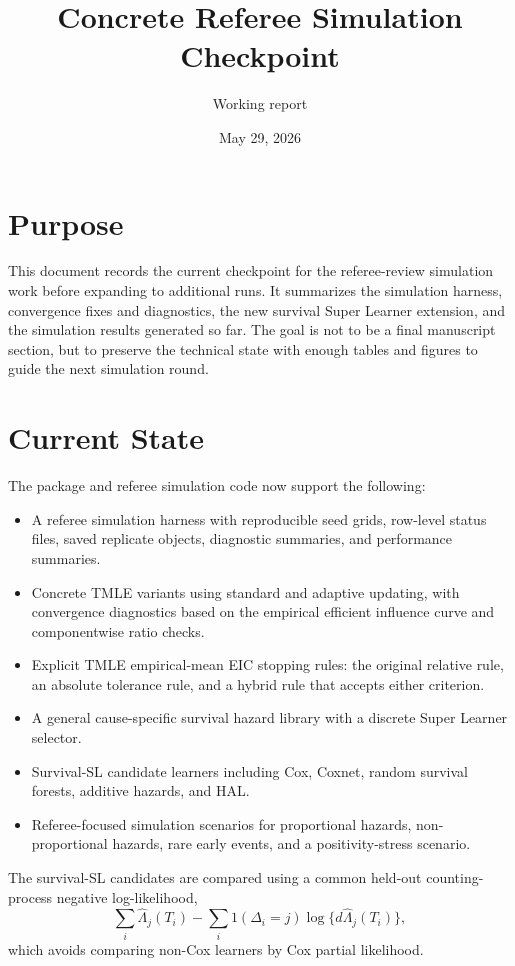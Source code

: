 \documentclass[11pt]{article}
\title{Concrete Referee Simulation Checkpoint}
\author{Working report}
\date{May 29, 2026}
\begin{document}
\maketitle

\section*{Purpose}

This document records the current checkpoint for the referee-review simulation work before expanding to additional runs. It summarizes the simulation harness, convergence fixes and diagnostics, the new survival Super Learner extension, and the simulation results generated so far. The goal is not to be a final manuscript section, but to preserve the technical state with enough tables and figures to guide the next simulation round.

\section{Current State}

The package and referee simulation code now support the following:

\begin{itemize}
  \item A referee simulation harness with reproducible seed grids, row-level status files, saved replicate objects, diagnostic summaries, and performance summaries.
  \item Concrete TMLE variants using standard and adaptive updating, with convergence diagnostics based on the empirical efficient influence curve and componentwise ratio checks.
  \item Explicit TMLE empirical-mean EIC stopping rules: the original relative rule, an absolute tolerance rule, and a hybrid rule that accepts either criterion.
  \item A general cause-specific survival hazard library with a discrete Super Learner selector.
  \item Survival-SL candidate learners including Cox, Coxnet, random survival forests, additive hazards, and HAL.
  \item Referee-focused simulation scenarios for proportional hazards, non-proportional hazards, rare early events, and a positivity-stress scenario.
\end{itemize}

The survival-SL candidates are compared using a common held-out counting-process negative log-likelihood,
\[
  \sum_i \widehat{\Lambda}_j(T_i) -
  \sum_i 1(\Delta_i = j)\log\{d\widehat{\Lambda}_j(T_i)\},
\]
which avoids comparing non-Cox learners by Cox partial likelihood.
\end{document}
